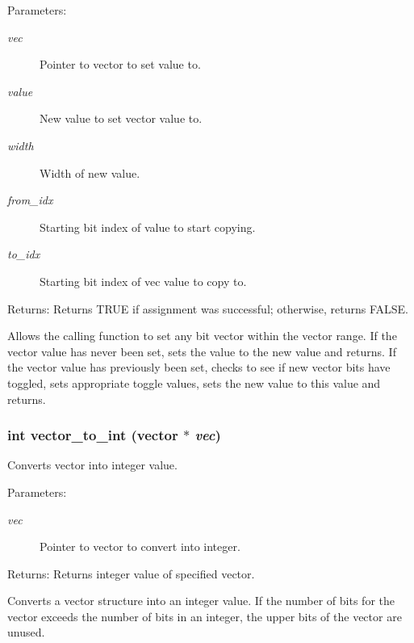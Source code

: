 \begin{Desc}
\item[Parameters:]
\begin{description}
\item[{\em vec}]Pointer to vector to set value to. \item[{\em value}]New value to set vector value to. \item[{\em width}]Width of new value. \item[{\em from\_\-idx}]Starting bit index of value to start copying. \item[{\em to\_\-idx}]Starting bit index of vec value to copy to. \end{description}
\end{Desc}
\begin{Desc}
\item[Returns:]Returns TRUE if assignment was successful; otherwise, returns FALSE.\end{Desc}
Allows the calling function to set any bit vector within the vector range. If the vector value has never been set, sets the value to the new value and returns. If the vector value has previously been set, checks to see if new vector bits have toggled, sets appropriate toggle values, sets the new value to this value and returns. 
\subsubsection{\setlength{\rightskip}{0pt plus 5cm}int vector\_\-to\_\-int ({\bf vector} $\ast$ {\em vec})}\label{vector_8c_a30}


Converts vector into integer value. 

\begin{Desc}
\item[Parameters:]
\begin{description}
\item[{\em vec}]Pointer to vector to convert into integer.\end{description}
\end{Desc}
\begin{Desc}
\item[Returns:]Returns integer value of specified vector.\end{Desc}
Converts a vector structure into an integer value. If the number of bits for the vector exceeds the number of bits in an integer, the upper bits of the vector are unused. 
